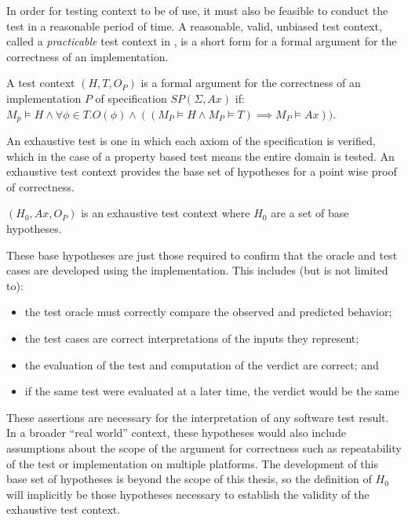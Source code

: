{In order for testing context to be of use, 
it must also be feasible to conduct the test in a reasonable period of time.
A reasonable, valid, unbiased test context,
called a \emph{practicable} test context in \cite{BernotGaudelMarre1991},
is a short form for a formal argument for the correctness of an implementation.

\begin{df}
A test context $(H, T, O_P)$ is a formal argument for 
the correctness of an implementation $P$ of specification $SP(\Sigma, Ax)$ if:
$M_{p} \models H \land \forall \phi \in T . O(\phi) \land 
((M_P \models H \land M_P \models T) \implies M_P \models Ax)) $.
\end{df}

An exhaustive test is one in which each axiom of the specification is verified,
which in the case of a property based test means the entire domain is tested.
An exhaustive test context provides the base set of hypotheses
for a point wise proof of correctness.

\begin{df}
$(H_{0}, Ax, O_P)$ is an exhaustive test context where
$H_{0}$ are a set of base hypotheses.
\end{df}

These base hypotheses are just those required to 
confirm that the oracle and test cases are developed using the implementation.
This includes (but is not limited to):

\begin{itemize}
\item the test oracle must correctly compare the observed and predicted behavior;
\item the test cases are correct interpretations of the inputs they represent;
\item the evaluation of the test and computation of the verdict are correct; and
\item if the same test were evaluated at a later time, the verdict would be the same
\end{itemize}
\noindent
These assertions are necessary for the interpretation of
any software test result.
In a broader ``real world'' context,
these hypotheses would also include assumptions
about the scope of the argument for correctness
such as repeatability of the test or implementation on multiple platforms.
The development of this base set of hypotheses is beyond the scope of this thesis,
so the definition of $H_0$ will implicitly be those hypotheses necessary 
to establish the validity of the exhaustive test context.

}
